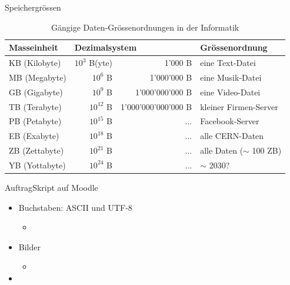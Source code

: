 \begin{frame}{Speichergrössen}
	\begin{table}[H]
		\footnotesize
		\centering
		\begin{tabular}{@{}l|rr|l@{}}
			\toprule
			\textbf{Masseinheit} & \multicolumn{2}{l|}{\textbf{Dezimalsystem}} & Grössenordnung                                   \\ \midrule
			KB (Kilobyte)        & $10^3$ B(yte)                               & 1'000 B             & eine Text-Datei            \\
			MB (Megabyte)        & $10^6$ B                                    & 1'000'000 B         & eine Musik-Datei           \\
			GB (Gigabyte)        & $10^9$ B                                    & 1'000'000'000 B     & eine Video-Datei           \\
			TB (Terabyte)        & $10^{12}$ B                                 & 1'000'000'000'000 B & kleiner Firmen-Server      \\
			PB (Petabyte)        & $10^{15}$ B                                 & ...                 & Facebook-Server            \\
			EB (Exabyte)         & $10^{18}$ B                                 & ...                 & alle CERN-Daten            \\
			ZB (Zettabyte)       & $10^{21}$ B                                 & ...                 & alle Daten ($\sim$ 100 ZB) \\
			YB (Yottabyte)       & $10^{24}$ B                                 & ...                 & $\sim$ 2030?               \\ \bottomrule
		\end{tabular}
		\caption*{Gängige Daten-Grössenordnungen in der Informatik}
	\end{table}
\end{frame}

\begin{frame}[fragile]{Auftrag}{Skript auf Moodle}
	\begin{itemize}
		\item Buchstaben: \acrshort{ASCII} und \acrshort{UTF-8}
		\begin{itemize}
			\item {}
		\end{itemize}
		\item Bilder
		\begin{itemize}
			\item {} 
		\end{itemize}
		\item {}
	\end{itemize}
\end{frame}
